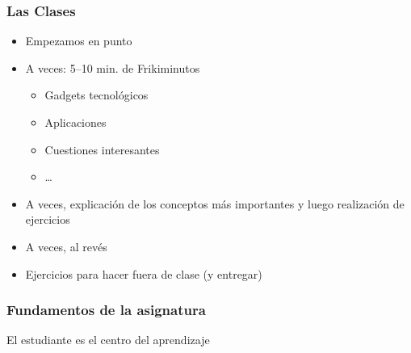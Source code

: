 \begin{frame}
\frametitle{Las Clases}

\begin{itemize}
  \item Empezamos en punto
  \item A veces: 5--10 min. de Frikiminutos
  \begin{itemize}
    \item Gadgets tecnológicos
    \item Aplicaciones
    \item Cuestiones interesantes
    \item \dots
  \end{itemize}
  \item A veces, explicación de los conceptos más importantes y luego
    realización de ejercicios
  \item A veces, al revés
  \item Ejercicios para hacer fuera de clase (y entregar)
\end{itemize}

\end{frame}




\begin{frame}
\frametitle{Fundamentos de la asignatura}

\vspace{-2.75cm}

\begin{center}
\Huge El estudiante es el centro del aprendizaje
\end{center}

\end{frame}
\usebackgroundtemplate{}

